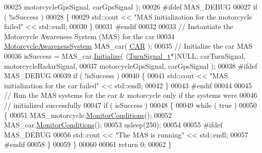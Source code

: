 \begin{DoxyCode}
00025                                            motorcycleGpsSignal, carGpsSignal );
00026 \textcolor{preprocessor}{#ifdef MAS\_DEBUG}
00027 \textcolor{preprocessor}{}    \textcolor{keywordflow}{if} ( !isSuccess )
00028     \{
00029         std::cout << \textcolor{stringliteral}{"MAS initialization for the motorcycle failed"} << std::endl;
00030     \}
00031 \textcolor{preprocessor}{#endif}
00032 \textcolor{preprocessor}{}
00033     \textcolor{comment}{// Instantiate the Motorcycle Awareness System (MAS) for the car}
00034     \hyperlink{classMotorcycleAwarenessSystem}{MotorcycleAwarenessSystem} MAS\_car( \hyperlink{MotorcycleAwarenessSystemTypes_8hpp_a0c05c42b98a847f971385c81c2a81afaa5fc54ebcb1dd4bf1e1b93cbc77b57b40}{CAR} );
00035     \textcolor{comment}{// Initialize the car MAS}
00036     isSuccess =  MAS\_car.\hyperlink{classMotorcycleAwarenessSystem_a341f27867c8d6aa0865040279ee246a9}{Initialize}( (\hyperlink{structTurnSignal__t}{TurnSignal\_t}*)NULL, carTurnSignal, 
      motorcycleRadarSignal,
00037                                      motorcycleGpsSignal, carGpsSignal );
00038 \textcolor{preprocessor}{#ifdef MAS\_DEBUG}
00039 \textcolor{preprocessor}{}    \textcolor{keywordflow}{if} ( !isSuccess )
00040     \{
00041         std::cout << \textcolor{stringliteral}{"MAS initialization for the car failed"} << std::endl;
00042     \}
00043 \textcolor{preprocessor}{#endif}
00044 \textcolor{preprocessor}{}
00045     \textcolor{comment}{// Run the MAS systems for the car & motorcycle only if the systems were}
00046     \textcolor{comment}{// initialized successfully}
00047     \textcolor{keywordflow}{if} ( isSuccess )
00048     \{
00049         \textcolor{keywordflow}{while} ( \textcolor{keyword}{true} )
00050         \{
00051             MAS\_motorcycle.\hyperlink{classMotorcycleAwarenessSystem_afb19e832c17d43941d9ed6c4f4435a2e}{MonitorConditions}();
00052             MAS\_car.\hyperlink{classMotorcycleAwarenessSystem_afb19e832c17d43941d9ed6c4f4435a2e}{MonitorConditions}();
00053             usleep(250);
00054 
00055 \textcolor{preprocessor}{#ifdef MAS\_DEBUG}
00056 \textcolor{preprocessor}{}            std::cout << \textcolor{stringliteral}{"The MAS is running"} << std::endl;
00057 \textcolor{preprocessor}{#endif}
00058 \textcolor{preprocessor}{}        \}
00059     \}
00060 
00061     \textcolor{keywordflow}{return} 0;
00062 \}
\end{DoxyCode}
